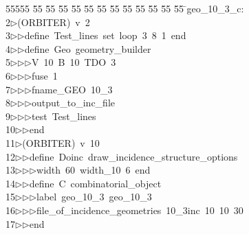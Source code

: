 %
%
\begin{tabbing}
55555 \= 55 \= 55 \= 55 \= 55 \= 55 \= 55 \= 55 \= 55 \= 55 \= 55 \= 55 \= 55 \= \>geo\_10\_3\_c:\\[0pt]
2\>$\triangleright$\>(ORBITER)\ v\ 2\ \\[0pt]
3\>$\triangleright$\>$\triangleright$\>define\ Test\_lines\ set\ loop\ 3\ 8\ 1\ end\ \\[0pt]
4\>$\triangleright$\>$\triangleright$\>define\ Geo\ geometry\_builder\ \\[0pt]
5\>$\triangleright$\>$\triangleright$\>$\triangleright$\>V\ 10\ B\ 10\ TDO\ 3\ \\[0pt]
6\>$\triangleright$\>$\triangleright$\>$\triangleright$\>fuse\ 1\ \\[0pt]
7\>$\triangleright$\>$\triangleright$\>$\triangleright$\>fname\_GEO\ 10\_3\ \\[0pt]
8\>$\triangleright$\>$\triangleright$\>$\triangleright$\>output\_to\_inc\_file\ \\[0pt]
9\>$\triangleright$\>$\triangleright$\>$\triangleright$\>test\ Test\_lines\ \\[0pt]
10\>$\triangleright$\>$\triangleright$\>end\\[0pt]
11\>$\triangleright$\>(ORBITER)\ v\ 10\ \\[0pt]
12\>$\triangleright$\>$\triangleright$\>define\ Doinc\ draw\_incidence\_structure\_options\ \\[0pt]
13\>$\triangleright$\>$\triangleright$\>$\triangleright$\>width\ 60\ width\_10\ 6\ end\ \\[0pt]
14\>$\triangleright$\>$\triangleright$\>define\ C\ combinatorial\_object\ \\[0pt]
15\>$\triangleright$\>$\triangleright$\>$\triangleright$\>label\ geo\_10\_3\ geo\_10\_3\ \\[0pt]
16\>$\triangleright$\>$\triangleright$\>$\triangleright$\>file\_of\_incidence\_geometries\ 10\_3inc\ 10\ 10\ 30\ \\[0pt]
17\>$\triangleright$\>$\triangleright$\>end\ \\[0pt]

\end{tabbing}
